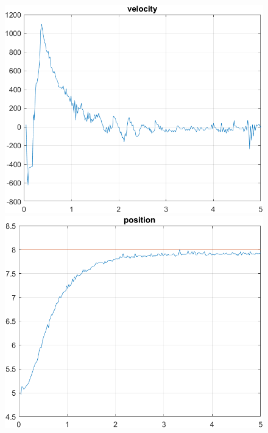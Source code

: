 \begin{figure}[H]
    \centering
    \begin{minipage}{0.45\textwidth}
        \includegraphics[width=\linewidth]{Images/lab2/1/vel221.png}
    \end{minipage}
    \hfill
    \begin{minipage}{0.45\textwidth}
        \includegraphics[width=\linewidth]{Images/lab2/1/pos221.png}
    \end{minipage}
    
    \vspace{0.5cm}
    

\end{figure}
